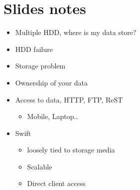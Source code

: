 \documentclass{article}
\begin{document}
\section{Slides notes}
\label{sec:orgheadline6}
\begin{itemize}
\item Multiple HDD, where is my data store?
\item HDD failure
\item Storage problem

\item Ownership of your data
\item Access to data, HTTP, FTP, ReST
\begin{itemize}
\item Mobile, Laptop..
\end{itemize}

\item Swift
\begin{itemize}
\item loosely tied to storage media
\item Scalable
\item Direct client access
\end{itemize}
\end{itemize}
\end{document}
